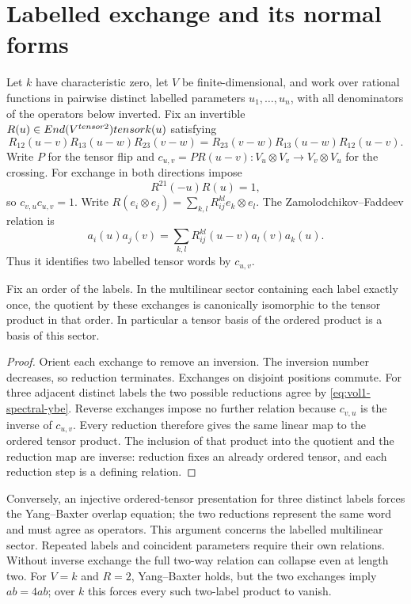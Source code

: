 \section{Labelled exchange and its normal forms}
Let $k$ have characteristic zero, let $V$ be finite-dimensional, and work over
rational functions in pairwise distinct labelled parameters $u_1,\ldots,u_n$,
with all denominators of the operators below inverted.
Fix an invertible $R(u)\in End(V^{tensor2})tensor k(u)$ satisfying
\begin{equation}\label{eq:vol1-spectral-ybe}
 R_{12}(u-v)R_{13}(u-w)R_{23}(v-w)
 =R_{23}(v-w)R_{13}(u-w)R_{12}(u-v).
\end{equation}
Write $P$ for the tensor flip and
$c_{u,v}=P R(u-v):V_u\otimes V_v\to V_v\otimes V_u$ for the crossing.
For exchange in both directions impose
\[
 R^{21}(-u)R(u)=1,
\]
so $c_{v,u}c_{u,v}=1$.
Write $R(e_i\otimes e_j)=\sum_{k,l}R_{ij}^{kl}e_k\otimes e_l$.
The Zamolodchikov--Faddeev relation is
\begin{equation}\label{eq:vol1-zf}
 a_i(u)a_j(v)=\sum_{k,l}R_{ij}^{kl}(u-v)a_l(v)a_k(u).
\end{equation}
Thus it identifies two labelled tensor words by $c_{u,v}$.

\begin{theorem}
Fix an order of the labels. In the multilinear sector containing each label
exactly once, the quotient by these exchanges is canonically isomorphic to
the tensor product in that order.
In particular a tensor basis of the ordered product is a basis of this sector.
\end{theorem}
\begin{proof}
Orient each exchange to remove an inversion. The inversion number decreases,
so reduction terminates. Exchanges on disjoint positions commute.
For three adjacent distinct labels the two possible reductions agree by
\eqref{eq:vol1-spectral-ybe}. Reverse exchanges impose no further relation because
$c_{v,u}$ is the inverse of $c_{u,v}$.
Every reduction therefore gives the same linear map to the ordered tensor product.
The inclusion of that product into the quotient and the reduction map are inverse:
reduction fixes an already ordered tensor, and each reduction step is a defining relation.
\end{proof}

Conversely, an injective ordered-tensor presentation for three distinct labels
forces the Yang--Baxter overlap equation; the two reductions represent the same
word and must agree as operators. This argument concerns the labelled multilinear
sector. Repeated labels and coincident parameters require their own relations.
Without inverse exchange the full two-way relation can collapse even at length two.
For $V=k$ and $R=2$, Yang--Baxter holds, but the two exchanges imply $ab=4ab$;
over $k$ this forces every such two-label product to vanish.

